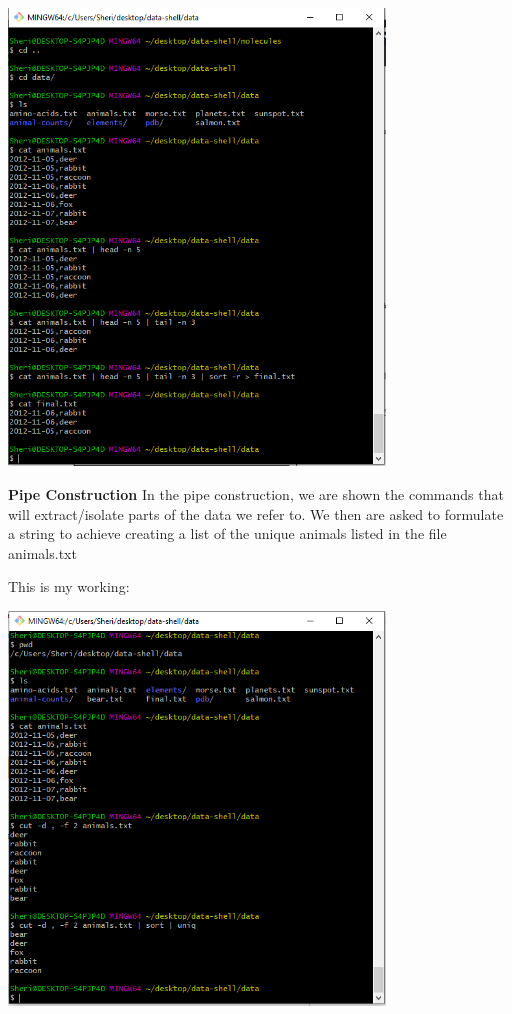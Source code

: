 \documentclass{article}
\begin{document}
\includegraphics[width=10cm]{Images/GitBash_039.PNG}

\textbf{Pipe Construction}
In the pipe construction, we are shown the commands that will extract/isolate parts of the data we refer to. 
We then are asked to formulate a string to achieve creating a list of the unique animals listed in the file animals.txt

This is my working:

\includegraphics[width=10cm]{Images/GitBash_040.PNG}
\end{document}
